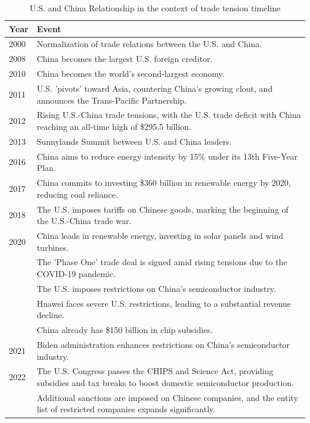 \begin{table}
     \centering
     \caption{U.S. and China Relationship in the context of trade tension timeline} \label{tab:timeline}
     \begin{tabular}{|p{}|p{}|}
     \toprule
       Year & Event \\
     \midrule
       2000 & Normalization of trade relations between the U.S. and China. \\
       2008 & China becomes the largest U.S. foreign creditor. \\
       2010 & China becomes the world's second-largest economy. \\
       2011 & U.S. 'pivots' toward Asia, countering China's growing clout, and announces the Trans-Pacific Partnership. \\
       2012 & Rising U.S.-China trade tensions, with the U.S. trade deficit with China reaching an all-time high of \$295.5 billion. \\
       2013 & Sunnylands Summit between U.S. and China leaders. \\
       2016 & China aims to reduce energy intensity by 15\% under its 13th Five-Year Plan. \\
       2017 & China commits to investing \$360 billion in renewable energy by 2020, reducing coal reliance. \\
       2018 & The U.S. imposes tariffs on Chinese goods, marking the beginning of the U.S.-China trade war. \\
       2020 & China leads in renewable energy, investing in solar panels and wind turbines. \\
            & The 'Phase One' trade deal is signed amid rising tensions due to the COVID-19 pandemic. \\
            & The U.S. imposes restrictions on China's semiconductor industry. \\
            & Huawei faces severe U.S. restrictions, leading to a substantial revenue decline. \\
            & China already has \$150 billion in chip subsidies. \\
       2021 & Biden administration enhances restrictions on China's semiconductor industry. \\
       2022 & The U.S. Congress passes the CHIPS and Science Act, providing subsidies and tax breaks to boost domestic semiconductor production. \\
            & Additional sanctions are imposed on Chinese companies, and the entity list of restricted companies expands significantly. \\

\end{tabular}
\end{table}

